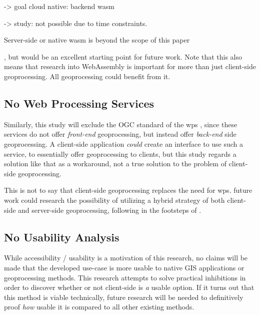 -> goal cloud native: backend wasm

-> study: not possible due to time constraints.

Server-side or native wasm is beyond the scope of this paper

, but would be an excellent starting point for future work. Note that this also means that research into WebAssembly is important for more than just client-side geoprocessing. All geoprocessing could benefit from it.



\subsection*{ No Web Processing Services } 
Similarly, this study will exclude the OGC standard of the \ac{wps} \cite{ogc_web_2015}, since these services do not offer \emph{front-end} geoprocessing, but instead offer \emph{back-end} side geoprocessing. A client-side application \textit{could} create an interface to use such a service, to essentially offer geoprocessing to clients, but this study regards a solution like that as a workaround, not a true solution to the problem of client-side geoprocessing. 

This is not to say that client-side geoprocessing replaces the need for \ac{wps}. 
future work could research the possibility of utilizing a hybrid strategy of both client-side and server-side geoprocessing, following in the footsteps of \cite{panidi_hybrid_2015}. 



\subsection*{ No Usability Analysis } %
While accessibility / usability is a motivation of this research, no claims will be made that the developed use-case is more usable to native GIS applications or geoprocessing methods. This research attempts to solve practical inhibitions in order to discover whether or not client-side is \emph{a} usable option. If it turns out that this method is viable technically, future research will be needed to definitively proof \emph{how} usable it is compared to all other existing methods.  


